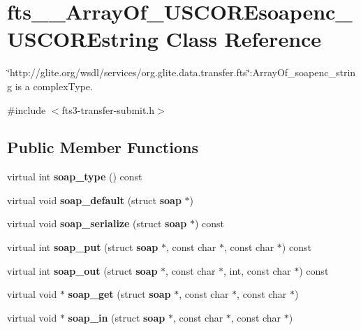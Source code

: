 \section{fts\_\-\_\-ArrayOf\_\-USCOREsoapenc\_\-USCOREstring Class Reference}
\label{classfts____ArrayOf__USCOREsoapenc__USCOREstring}


\char`\"{}http://glite.org/wsdl/services/org.glite.data.transfer.fts\char`\"{}:ArrayOf\_\-soapenc\_\-string is a complexType.  




{\ttfamily \#include $<$fts3-\/transfer-\/submit.h$>$}

\subsection*{Public Member Functions}
\begin{DoxyCompactItemize}
\item 
virtual int {\bfseries soap\_\-type} () const \label{classfts____ArrayOf__USCOREsoapenc__USCOREstring_ad9e80dc42321a192e2d7d18372b6debd}

\item 
virtual void {\bfseries soap\_\-default} (struct {\bf soap} $\ast$)\label{classfts____ArrayOf__USCOREsoapenc__USCOREstring_a2e77fb7275031041e548e0986b0600fd}

\item 
virtual void {\bfseries soap\_\-serialize} (struct {\bf soap} $\ast$) const \label{classfts____ArrayOf__USCOREsoapenc__USCOREstring_a2a9e0d4c20aa84974b5b42e78c36cb73}

\item 
virtual int {\bfseries soap\_\-put} (struct {\bf soap} $\ast$, const char $\ast$, const char $\ast$) const \label{classfts____ArrayOf__USCOREsoapenc__USCOREstring_a729745acae41ca40c548729641c8bc53}

\item 
virtual int {\bfseries soap\_\-out} (struct {\bf soap} $\ast$, const char $\ast$, int, const char $\ast$) const \label{classfts____ArrayOf__USCOREsoapenc__USCOREstring_a5bfca77925e70faeac867a42ea94527e}

\item 
virtual void $\ast$ {\bfseries soap\_\-get} (struct {\bf soap} $\ast$, const char $\ast$, const char $\ast$)\label{classfts____ArrayOf__USCOREsoapenc__USCOREstring_a3ffdb1b8825144c6abe07c6c6aa876ba}

\item 
virtual void $\ast$ {\bfseries soap\_\-in} (struct {\bf soap} $\ast$, const char $\ast$, const char $\ast$)\label{classfts____ArrayOf__USCOREsoapenc__USCOREstring_a9d96c85a19c6d47ac366cee17fc93336}

\end{DoxyCompactItemize}

